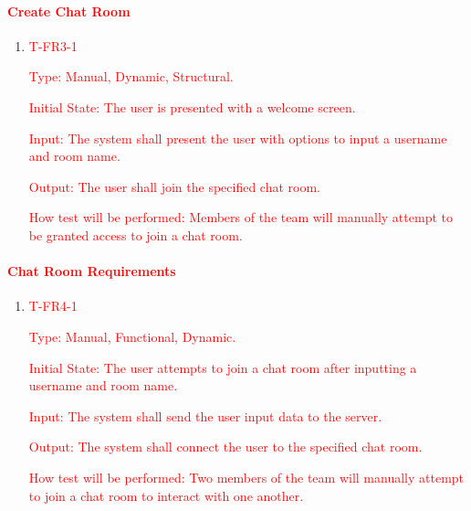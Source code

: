 \documentclass[12pt, titlepage]{article}
\begin{document}
        \paragraph{\textcolor{red}{Create Chat Room}}

        \begin{enumerate}

        \item{\textcolor{red}{{T-FR3-1\\}}}

            \textcolor{red}{Type: Manual, Dynamic, Structural.}
            					
            \textcolor{red}{Initial State: The user is presented with a welcome screen.}
            					
            \textcolor{red}{Input: The system shall present the user with options to input a username and room name.}
            					
            \textcolor{red}{Output: The user shall join the specified chat room.}
            					
            \textcolor{red}{How test will be performed: Members of the team will manually attempt to be granted access to join a chat room.}

        \end{enumerate}

    \paragraph{\textcolor{red}{Chat Room Requirements}}
    
        \begin{enumerate}
            
        \item{\textcolor{red}{T-FR4-1\\}}
        
            \textcolor{red}{Type: Manual, Functional, Dynamic.}
            					
            \textcolor{red}{Initial State: The user attempts to join a chat room after inputting a username and room name.}
            					
            \textcolor{red}{Input: The system shall send the user input data to the server.}
            					
            \textcolor{red}{Output: The system shall connect the user to the specified chat room.}
            					
            \textcolor{red}{How test will be performed: Two members of the team will manually attempt to join a chat room to interact with one another.}

        \end{enumerate}
        
\end{document}
